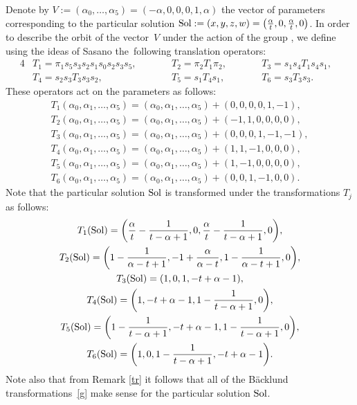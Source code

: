 \documentclass[pdftex]{sigma}
\numberwithin{equation}{section}
\begin{document}
 Denote by $V:=(\alpha_0, \dots, \alpha_5)=(-\alpha, 0, 0, 0, 1, \alpha)$ the vector of parameters corresponding to the
 particular solution ${\rm Sol}:=(x, y, z, w)=\bigl(\frac{\alpha}{t}, 0, \frac{\alpha}{t}, 0\bigr)$. In order to
 describe the orbit of the vector~$V$ under the action of the group , we define
 using the ideas of Sasano the~following translation operators:
 \begin{alignat*}{4}
 &T_1=\pi_1 s_5 s_3 s_2 s_1 s_0 s_2 s_3 s_5,\qquad&&
 T_2=\pi_2 T_1 \pi_2, \qquad&& T_3=s_1 s_4 T_1 s_4 s_1, &\\
 &T_4=s_2 s_3 T_3 s_3 s_2,
 \qquad&& T_5=s_1 T_4 s_1,\qquad&&
 T_6=s_3 T_3 s_3 .&
 \end{alignat*}
 These operators act on the parameters as follows:
 \begin{gather*}
 T_1(\alpha_0, \alpha_1, \dots, \alpha_5) =
 (\alpha_0, \alpha_1, \dots, \alpha_5) + (0, 0, 0, 0, 1, -1),\\
 T_2(\alpha_0, \alpha_1, \dots, \alpha_5) =
 (\alpha_0, \alpha_1, \dots, \alpha_5) + (-1, 1, 0, 0, 0, 0),\\
 T_3(\alpha_0, \alpha_1, \dots, \alpha_5) =
 (\alpha_0, \alpha_1, \dots, \alpha_5) + (0, 0, 0, 1, -1, -1),\\
 T_4(\alpha_0, \alpha_1, \dots, \alpha_5) =
 (\alpha_0, \alpha_1, \dots, \alpha_5) + (1, 1, -1, 0, 0, 0),\\
 T_5(\alpha_0, \alpha_1, \dots, \alpha_5) =
 (\alpha_0, \alpha_1, \dots, \alpha_5) + (1, -1, 0, 0, 0, 0),\\
 T_6(\alpha_0, \alpha_1, \dots, \alpha_5) =
 (\alpha_0, \alpha_1, \dots, \alpha_5) + (0, 0, 1, -1, 0, 0) .
 \end{gather*}
 Note that the particular solution ${\rm Sol}$
 is transformed under the transformations $T_j$ as follows:
 \begin{gather*}
 T_1 ({\rm Sol}) =
 \biggl(\frac{\alpha}{t} - \frac{1}{t-\alpha+1}, 0, \frac{\alpha}{t} - \frac{1}{t-\alpha+1}, 0\biggr),\\
 T_2 ({\rm Sol}) =
 \biggl(1- \frac{1}{\alpha-t+1}, -1 + \frac{\alpha}{\alpha-t}, 1- \frac{1}{\alpha-t+1}, 0\biggr),\\
 T_3({\rm Sol}) =
 (1, 0, 1, -t+\alpha-1),\\
 T_4({\rm Sol}) =
 \biggl(1, -t + \alpha-1, 1 - \frac{1}{t-\alpha+1}, 0\biggr),\\
 T_5({\rm Sol}) =
 \biggl(1 - \frac{1}{t-\alpha+1}, -t+\alpha-1, 1- \frac{1}{t-\alpha+1}, 0\biggr),\\
 T_6({\rm Sol}) =
 \biggl(1 , 0, 1- \frac{1}{t-\alpha+1}, -t + \alpha-1\biggr) .
 \end{gather*}
 Note also that from Remark \ref{tr} it follows that all of the B\"{a}cklund transformations~\eqref{g} make sense for the particular solution
 ${\rm Sol}$.
\end{document}
